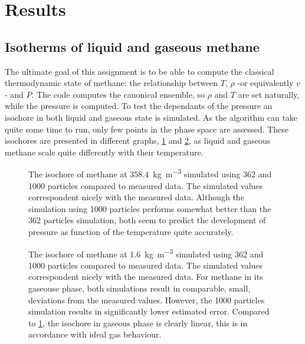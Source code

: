 \section{Results}
\subsection{Isotherms of liquid and gaseous methane}
The ultimate goal of this assignment is to be able to compute the classical thermodynamic state of methane: the relationship between $T$, $\rho$ -or equivalently $v$- and $P$. The code computes the canonical ensemble, so $\rho$ and $T$ are set naturally, while the pressure is computed. To test the dependants of the pressure an isochore in both liquid and gaseous state is simulated. As the algorithm can take quite some time to run, only few points in the phase space are assessed. These isochores are presented in different graphs, \cref{fig:Liquid_result} and \cref{fig:Gas_result}, as liquid and gaseous methane scale quite differently with their temperature.

\begin{figure}[th!]
	\centering
	\small
	\def\svgwidth{0.95\columnwidth}
	
	\caption{The isochore of methane at \SI{358.4}{\kg\per\m^3} simulated using \num{362} and \num{1000} particles compared to measured data. The simulated values correspondent nicely with the measured data. Although the simulation using \num{1000} particles performs somewhat better than the \num{362} particles simulation, both seem to predict the development of pressure as function of the temperature quite accurately.}
	\label{fig:Liquid_result}
\end{figure}

\begin{figure}[th!]
	\centering
	\small
	\def\svgwidth{0.95\columnwidth}
	
	\caption{The isochore of methane at \SI{1.6}{\kg\per\m^3} simulated using \num{362} and \num{1000} particles compared to measured data. The simulated values correspondent nicely with the measured data. For methane in its gaseouse phase, both simulations result in comparable, small, deviations from the measured values. However, the \num{1000} particles simulation results in significantly lower estimated error. Compared to \cref{fig:Liquid_result}, the isochore in gaseous phase is clearly linear, this is in accordance with ideal gas behaviour.}
	\label{fig:Gas_result}
\end{figure}

